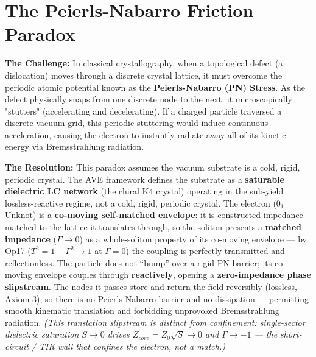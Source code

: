 \section{The Peierls-Nabarro Friction Paradox}
\textbf{The Challenge:} In classical crystallography, when a topological defect (a dislocation) moves through a discrete crystal lattice, it must overcome the periodic atomic potential known as the \textbf{Peierls-Nabarro (PN) Stress}. As the defect physically snaps from one discrete node to the next, it microscopically "stutters" (accelerating and decelerating). If a charged particle traversed a discrete vacuum grid, this periodic stuttering would induce continuous acceleration, causing the electron to instantly radiate away all of its kinetic energy via Bremsstrahlung radiation.

\textbf{The Resolution:} This paradox assumes the vacuum substrate is a cold, rigid, periodic crystal. The AVE framework defines the substrate as a \textbf{saturable dielectric LC network} (the chiral K4 crystal) operating in the sub-yield lossless-reactive regime, not a cold, rigid, periodic crystal. The electron ($0_1$ Unknot) is a \textbf{co-moving self-matched envelope}: it is constructed impedance-matched to the lattice it translates through, so the soliton presents a \textbf{matched impedance} ($\Gamma \to 0$) as a whole-soliton property of its co-moving envelope --- by Op17 ($T^2 = 1 - \Gamma^2 \to 1$ at $\Gamma = 0$) the coupling is perfectly transmitted and reflectionless. The particle does not ``bump'' over a rigid PN barrier; its co-moving envelope couples through \textbf{reactively}, opening a \textbf{zero-impedance phase slipstream}. The nodes it passes store and return the field reversibly (lossless, Axiom 3), so there is no Peierls-Nabarro barrier and no dissipation --- permitting smooth kinematic translation and forbidding unprovoked Bremsstrahlung radiation. \emph{(This translation slipstream is distinct from confinement: single-sector dielectric saturation $S \to 0$ drives $Z_{core} = Z_0\sqrt{S} \to 0$ and $\Gamma \to -1$\gammaundeclared{} --- the short-circuit / TIR wall that \emph{confines} the electron, not a match.)}
